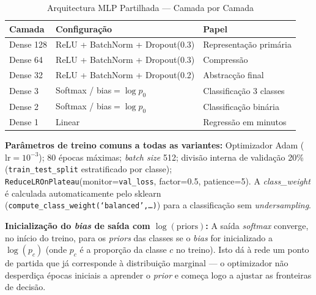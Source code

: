 \documentclass[conference]{IEEEtran}
\begin{document}
\begin{table}[h]
\centering
\caption{Arquitectura MLP Partilhada — Camada por Camada}
\label{tab:mlp_arch}
\begin{tabular}{p{1.5cm}p{3.2cm}p{2.5cm}}
\toprule
\textbf{Camada} & \textbf{Configuração} & \textbf{Papel} \\
\midrule
Dense 128 & ReLU + BatchNorm + Dropout(0.3) & Representação primária \\
Dense 64  & ReLU + BatchNorm + Dropout(0.3) & Compressão \\
Dense 32  & ReLU + BatchNorm + Dropout(0.2) & Abstracção final \\
Dense 3   & Softmax / bias$=\log p_0$        & Classificação 3 classes \\
Dense 2   & Softmax / bias$=\log p_0$        & Classificação binária \\
Dense 1   & Linear                           & Regressão em minutos \\
\bottomrule
\end{tabular}
\end{table}

\noindent\textbf{Parâmetros de treino comuns a todas as variantes:}
Optimizador Adam ($\text{lr}=10^{-3}$); 80 épocas máximas; \textit{batch
size} 512; divisão interna de validação 20\% (\texttt{train\_test\_split}
estratificado por classe); \texttt{ReduceLROnPlateau}(monitor=\texttt{val\_loss},
factor=0.5, patience=5). A \textit{class\_weight} é calculada automaticamente
pelo sklearn (\texttt{compute\_class\_weight(`balanced',\ldots)}) para a
classificação sem \textit{undersampling}.

\noindent\textbf{Inicialização do \textit{bias} de saída com
$\log(\text{priors})$:} A saída \textit{softmax} converge, no início do treino,
para os \textit{priors} das classes se o \textit{bias} for inicializado a
$\log(p_c)$ (onde $p_c$ é a proporção da classe $c$ no treino). Isto dá à rede
um ponto de partida que já corresponde à distribuição marginal — o optimizador
não desperdiça épocas iniciais a aprender o \textit{prior} e começa logo a
ajustar as fronteiras de decisão.
\end{document}
